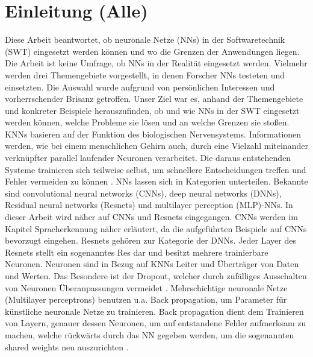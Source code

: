 \section{Einleitung (Alle)}
Diese Arbeit beantwortet, ob neuronale Netze (NNs) in der Softwaretechnik (SWT) eingesetzt werden können und wo die Grenzen der Anwendungen liegen. Die Arbeit ist keine Umfrage, ob NNs in der Realität eingesetzt werden. Vielmehr werden drei Themengebiete vorgestellt, in denen Forscher NNs testeten und einsetzten. Die Auswahl wurde aufgrund von persönlichen Interessen und vorherrschender Brisanz getroffen. Unser Ziel war es, anhand der Themengebiete und konkreter Beispiele herauszufinden, ob und wie NNs in der SWT eingesetzt werden können, welche Probleme sie lösen und an welche Grenzen sie stoßen.
KNNs basieren auf der Funktion des biologischen Nervensystems. Informationen werden, wie bei einem menschlichen Gehirn auch, durch eine Vielzahl miteinander verknüpfter parallel laufender Neuronen  verarbeitet. Die daraus entstehenden Systeme trainieren sich teilweise selbst, um schnellere Entscheidungen treffen und Fehler vermeiden zu können \cite{technology}. 
NNs lassen sich in Kategorien unterteilen. Bekannte sind convolutional neural networks (CNNs), deep neural networks (DNNs), Residual neural networks (Resnets) und multilayer perception (MLP)-NNs. In dieser Arbeit wird näher auf CNNs und Resnets eingegangen. CNNs werden im Kapitel Spracherkennung näher erläutert, da die aufgeführten Beispiele auf CNNs bevorzugt eingehen. Resnets gehören zur Kategorie der DNNs. Jeder Layer des Resnets stellt ein sogenanntes Res dar und besitzt mehrere trainierbare Neuronen. Neuronen sind in Bezug auf KNNs Leiter und Überträger von Daten und Werten. Das Besondere ist der Dropout, welcher durch zufälliges Ausschalten von Neuronen Überanpassungen vermeidet \cite{residualnn}. Mehrschichtige neuronale Netze (Multilayer perceptrons) benutzen u.a. Back propagation, um Parameter für künstliche neuronale Netze zu trainieren. Back propagation dient dem Trainieren von Layern, genauer dessen Neuronen, um auf entstandene Fehler aufmerksam zu machen, welche rückwärts durch das NN gegeben werden, um die sogenannten shared weights neu auszurichten \cite{usingcnn}.\\
\vspace{6.0cm}

